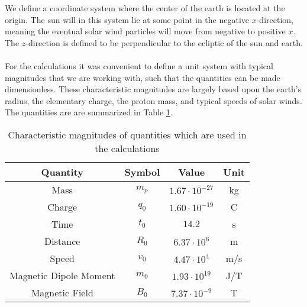 We define a coordinate system where the center of the earth is located at the origin. The sun will in this system lie at some point in the negative $x$-direction, meaning the eventual solar wind particles will move from negative to positive $x$. The $z$-direction is defined to be perpendicular to the ecliptic of the sun and earth.\\
\\
For the calculations it was convenient to define a unit system with typical magnitudes that we are working with, such that the quantities can be made dimensionless. These characteristic magnitudes are largely based upon the earth's radius, the elementary charge, the proton mass, and typical speeds of solar winds. The quantities are are summarized in Table \ref{tab:characteristicMagnitudes}.

\begin{table}[ht]
    \centering
    \begin{tabular}{|c|c|c|c|}
        \hline
        Quantity & Symbol & Value & Unit\\
        \hline
        Mass & $m_p$ & $1.67\cdot10^{-27}$ & kg \\
        Charge & $q_0$ & $1.60\cdot10^{-19}$ & C \\
        Time & $t_0$ & $14.2$ & s \\
        Distance & $R_0$ & $6.37\cdot 10^{6}$ & m \\
        Speed & $v_0$ & $4.47\cdot10^4$ & m/s \\
        Magnetic Dipole Moment & $m_0$ & $1.93\cdot10^{19}$ & J/T \\
        Magnetic Field & $B_0$ & $7.37\cdot10^{-9}$ & T \\
        \hline
    \end{tabular}
    \caption{Characteristic magnitudes of quantities which are used in the calculations}
    \label{tab:characteristicMagnitudes}
\end{table}

